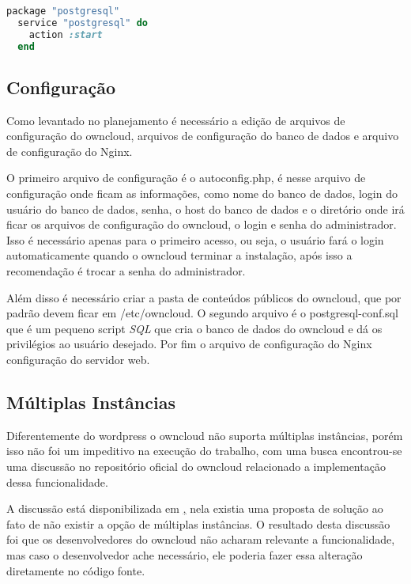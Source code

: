 \begin{lstlisting}[language=Ruby,label=dice_index,caption={Exemplo de como habilitar serviço do postgresql com chef}]
  package "postgresql"
  service "postgresql" do
    action :start
  end
\end{lstlisting}

\subsection{Configuração}

Como levantado no planejamento é necessário a edição de arquivos de configuração
do owncloud, arquivos de configuração do banco de dados e arquivo de configuração
do Nginx.

O primeiro arquivo de configuração é o autoconfig.php, é nesse arquivo de
configuração onde ficam as informações, como nome do banco de dados,
login do usuário do banco de dados, senha, o host do banco de dados e o diretório
onde irá ficar os arquivos de configuração do owncloud, o login e senha
do administrador. Isso é necessário apenas para o primeiro acesso, ou seja, o usuário
fará o login automaticamente quando o owncloud terminar a instalação, após isso
a recomendação é trocar a senha do administrador.

Além disso é necessário criar a pasta de conteúdos públicos do owncloud, que por
padrão devem ficar em /etc/owncloud. O segundo arquivo é o postgresql-conf.sql
que é um pequeno script \textit{SQL} que cria o banco de dados do owncloud e dá os
privilégios ao usuário desejado. Por fim o arquivo de configuração do Nginx
configuração do servidor web.

\subsection{Múltiplas Instâncias}

Diferentemente do wordpress o owncloud não suporta múltiplas instâncias, porém isso
não foi um impeditivo na execução do trabalho, com uma busca encontrou-se uma 
discussão no repositório oficial do owncloud relacionado a implementação dessa 
funcionalidade. 

A discussão está disponibilizada em 
\href{https://github.com/owncloud/core/pull/16424}, nela existia
uma proposta de solução ao fato de não existir a opção de múltiplas instâncias. O
resultado desta discussão foi que os desenvolvedores do owncloud não acharam relevante
a funcionalidade, mas caso o desenvolvedor ache necessário, ele poderia fazer essa
alteração diretamente no código fonte.


